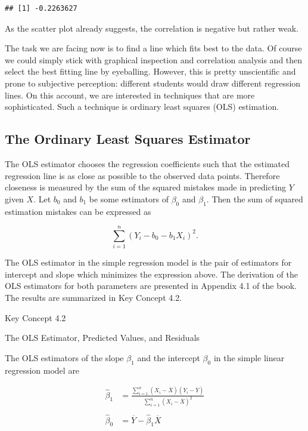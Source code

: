 \documentclass[]{book}
\theoremstyle{definition}
\theoremstyle{definition}
\theoremstyle{definition}
\theoremstyle{remark}
\begin{document}
\begin{verbatim}
## [1] -0.2263627
\end{verbatim}

As the scatter plot already suggests, the correlation is negative but
rather weak.

The task we are facing now is to find a line which fits best to the
data. Of course we could simply stick with graphical inspection and
correlation analysis and then select the best fitting line by
eyeballing. However, this is pretty unscientific and prone to subjective
perception: different students would draw different regression lines. On
this account, we are interested in techniques that are more
sophisticated. Such a technique is ordinary least squares (OLS)
estimation.

\subsection*{The Ordinary Least Squares
Estimator}\label{the-ordinary-least-squares-estimator}

The OLS estimator chooses the regression coefficients such that the
estimated regression line is as close as possible to the observed data
points. Therefore closeness is measured by the sum of the squared
mistakes made in predicting \(Y\) given \(X\). Let \(b_0\) and \(b_1\)
be some estimators of \(\beta_0\) and \(\beta_1\). Then the sum of
squared estimation mistakes can be expressed as

\[ \sum^n_{i = 1} (Y_i - b_0 - b_1 X_i)^2. \]

The OLS estimator in the simple regression model is the pair of
estimators for intercept and slope which minimizes the expression above.
The derivation of the OLS estimators for both parameters are presented
in Appendix 4.1 of the book. The results are summarized in Key Concept
4.2.

Key Concept 4.2

The OLS Estimator, Predicted Values, and Residuals

The OLS estimators of the slope \(\beta_1\) and the intercept
\(\beta_0\) in the simple linear regression model are

\begin{align}
  \hat\beta_1 & = \frac{ \sum_{i = 1}^n (X_i - \overline{X})(Y_i - \overline{Y}) } { \sum_{i=1}^n (X_i - \overline{X})^2}  \\
  \\
  \hat\beta_0 & =  \overline{Y} - \hat\beta_1 \overline{X} 
\end{align}
\end{document}
